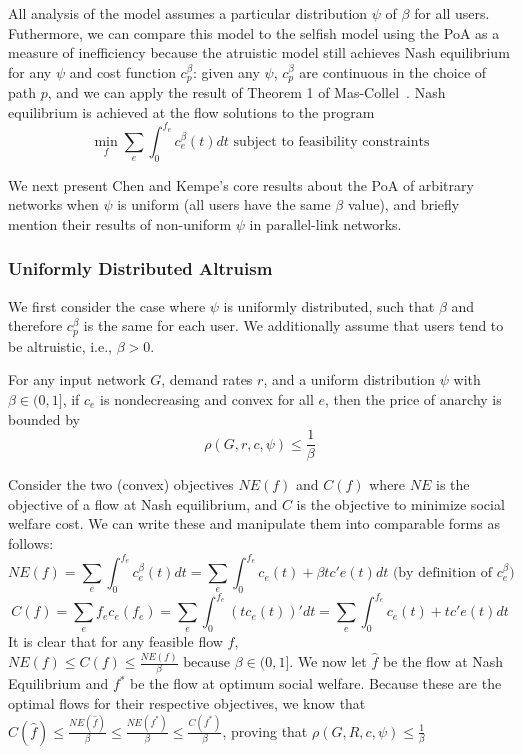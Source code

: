 All analysis of the model assumes a particular distribution $\psi$ of $\beta$ for all users. 
Futhermore, we can compare this model to the selfish model using the PoA as a measure of inefficiency
because the atruistic model still achieves Nash equilibrium for any $\psi$ and cost function $c^\beta_p$: given any $\psi$, $c^\beta_p$ are continuous in the choice of path $p$, and we can apply the result of Theorem 1 of Mas-Collel~\cite{mascolell}. Nash equilibrium is achieved at the flow solutions to the program
$$\min_f\sum_e\int_0^{f_e}c_e^\beta(t)dt \text{ subject to feasibility constraints}$$

We next present Chen and Kempe's core results about the PoA of arbitrary networks when $\psi$ is uniform (all users have the same $\beta$ value), and briefly mention their results of non-uniform $\psi$ in parallel-link networks.

\subsubsection{Uniformly Distributed Altruism}
We first consider the case where $\psi$ is uniformly distributed, such that $\beta$ and therefore $c^\beta_p$ is the same for each user. We additionally assume that users tend to be altruistic, i.e., $\beta > 0$.
\begin{theorem}
For any input network $G$, demand rates $r$, and 
a uniform distribution $\psi$ with $\beta \in (0, 1]$,
if $c_e$ is nondecreasing and convex for all $e$,
    then the price of anarchy is bounded by 
    $$\rho(G,r,c,\psi) \le \frac{1}{\beta}$$
\end{theorem}

\begin{proof-sketch}
    Consider the two (convex) objectives $NE(f)$ and $C(f)$ where $NE$ is the objective of a flow at Nash equilibrium, and $C$ is the objective to minimize social welfare cost. We can write these and manipulate them into comparable forms as follows:
    $$NE({f}) = \sum_e\int_0^{{f}_e}c_e^\beta(t)dt = 
        \sum_e\int_0^{{f}_e} c_e(t) + \beta tc'e(t)dt\text{ (by definition of $c^\beta_e$)}$$
    $$C(f) = \sum_ef_ec_e(f_e) = \sum_e\int_0^{f_e} (tc_e(t))' dt 
        = \sum_e\int_0^{f_e} c_e(t) + tc'e(t)dt$$ 
    It is clear that for any feasible flow $f$, 
    $NE(f) \le C(f) \le \frac{NE(f)}{\beta} \text{ because $\beta\in(0,1]$}$.
    We now let $\hat{f}$ be the flow at Nash Equilibrium and $f^*$ be the flow at optimum social welfare. Because these are the optimal flows for their respective objectives, we know that 
    $C(\hat{f}) \le \frac{NE(\hat{f})}{\beta} \le \frac{NE(f^*)}{\beta} \le \frac{C(f^*)}{\beta}$,
    proving that 
    $\rho(G,R,c,\psi) \le \frac{1}{\beta}$
\end{proof-sketch}

